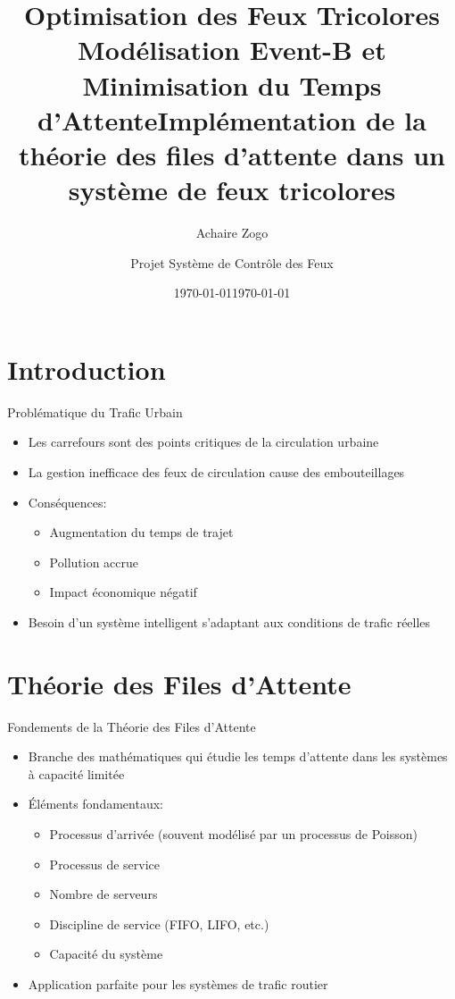 \documentclass[11pt,a4paper]{article}
\title{\LARGE\textbf{Optimisation des Feux Tricolores\\\vspace{0.5em}\normalsize{Modélisation Event-B et Minimisation du Temps d'Attente}}}
\author{Achaire Zogo}
\date{\today}
\title{Implémentation de la théorie des files d'attente dans un système de feux tricolores}
\author{Projet Système de Contrôle des Feux}
\date{\today}
\begin{document}
\maketitle

\section{Introduction}

\begin{frame}{Problématique du Trafic Urbain}
\begin{itemize}
\item Les carrefours sont des points critiques de la circulation urbaine
\item La gestion inefficace des feux de circulation cause des embouteillages
\item Conséquences:
    \begin{itemize}
    \item Augmentation du temps de trajet
    \item Pollution accrue
    \item Impact économique négatif
    \end{itemize}
\item Besoin d'un système intelligent s'adaptant aux conditions de trafic réelles
\end{itemize}
\end{frame}

\section{Théorie des Files d'Attente}

\begin{frame}{Fondements de la Théorie des Files d'Attente}
\begin{itemize}
\item Branche des mathématiques qui étudie les temps d'attente dans les systèmes à capacité limitée
\item Éléments fondamentaux:
    \begin{itemize}
    \item Processus d'arrivée (souvent modélisé par un processus de Poisson)
    \item Processus de service
    \item Nombre de serveurs
    \item Discipline de service (FIFO, LIFO, etc.)
    \item Capacité du système
    \end{itemize}
\item Application parfaite pour les systèmes de trafic routier
\end{itemize}
\end{frame}
\end{document}
